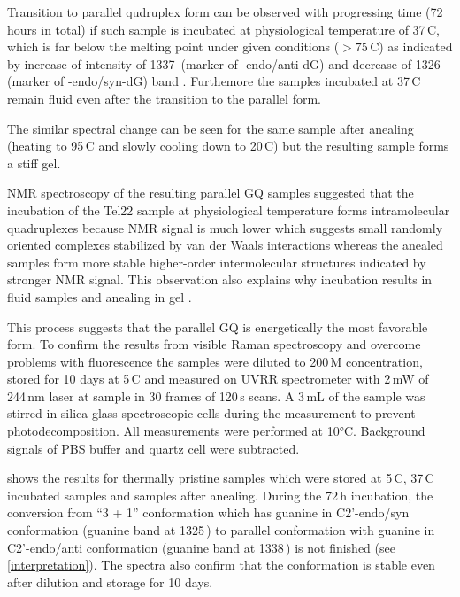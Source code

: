 Transition to parallel qudruplex form can be observed with progressing time
(72\,hours in total) if such sample is incubated at physiological temperature
of 37\,\textdegree{}C, which is far below the melting point under given
conditions ($> 75$\,\textdegree{}C) as indicated by increase of intensity of
1337\,\icm{} (marker of -endo/anti-dG) and decrease of
1326\,\icm{} (marker of -endo/syn-dG) band
\parencite{%
	Nishimura1986b,%
	Benevides1988a,%
	Miura1994,%
	Miura1995,%
	Miura1995a,%
	Krafft2002%
}.
Furthemore the samples incubated at 37\,\textdegree{}C remain fluid even after
the transition to the parallel form.

The similar spectral change can be seen for the same sample after anealing
(heating to 95\,\textdegree{}C and slowly cooling down to 20\,\textdegree{}C)
but the resulting sample forms a stiff gel.

NMR spectroscopy of the resulting parallel GQ samples suggested that the
incubation of the Tel22 sample at physiological temperature forms
intramolecular quadruplexes because NMR signal is much lower which suggests
small randomly oriented complexes stabilized by van der Waals interactions
whereas the anealed samples form more stable higher-order intermolecular
structures indicated by stronger NMR signal.
This observation also explains why incubation results in fluid samples and
anealing in gel
\parencite[publication in preparation]{Lindnerova-Mudronova2022}.

This process suggests that the parallel GQ is energetically the most favorable
form.
To confirm the results from visible Raman spectroscopy and overcome problems
with fluorescence the samples were diluted to 200\,M concentration,
stored for 10 days at 5\,\textdegree{}C and measured on UVRR spectrometer with
2\,mW of 244\,nm laser at sample in 30 frames of 120\,s scans.
A 3\,mL of the sample was stirred in silica glass spectroscopic cells during
the measurement to prevent photodecomposition.
All measurements were performed at 10°C.
Background signals of PBS buffer and quartz cell were subtracted.

 shows the results for thermally pristine samples
which were stored at 5\,\textdegree{}C, 37\,\textdegree{}C incubated samples
and samples after anealing.
During the 72\,h incubation, the conversion from “3 + 1” conformation which
has guanine in C2'-endo/syn conformation (guanine band at 1325\,\icm{}) to
parallel conformation with guanine in C2'-endo/anti conformation (guanine
band at 1338\,\icm{}) is not finished (see \cref{interpretation}).
The spectra also confirm that the conformation is stable even after dilution
and storage for 10 days.

